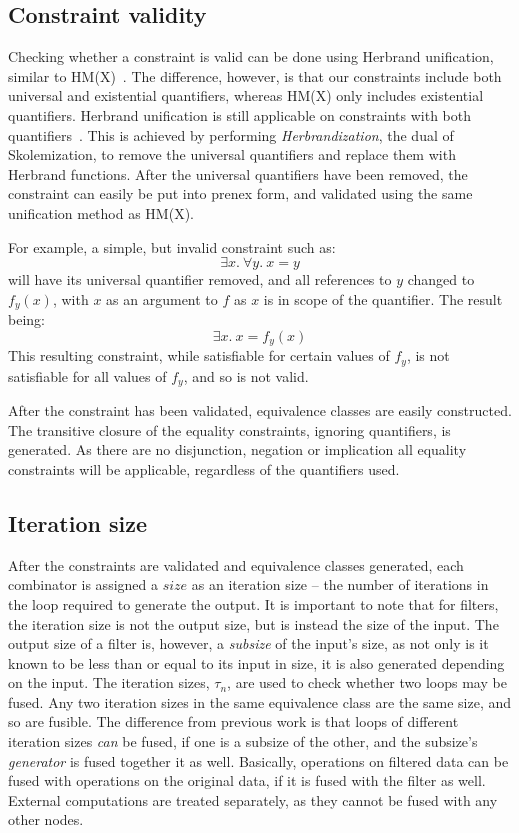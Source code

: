 \subsection{Constraint validity}
Checking whether a constraint is valid can be done using Herbrand unification, similar to HM(X)~\cite{odersky1999type}.
The difference, however, is that our constraints include both universal and existential quantifiers, whereas HM(X) only includes existential quantifiers.
Herbrand unification is still applicable on constraints with both quantifiers~\cite{buss1995herbrand}.
This is achieved by performing \emph{Herbrandization}, the dual of Skolemization, to remove the universal quantifiers and replace them with Herbrand functions.
After the universal quantifiers have been removed, the constraint can easily be put into prenex form, and validated using the same unification method as HM(X).

For example, a simple, but invalid constraint such as:
\[ \exists x.\ \forall y.\ x = y \]
will have its universal quantifier removed, and all references to $y$ changed to $f_y(x)$, with $x$ as an argument to $f$ as $x$ is in scope of the quantifier.
The result being:
\[ \exists x.\ x = f_y(x) \]
This resulting constraint, while satisfiable for certain values of $f_y$, is not satisfiable for all values of $f_y$, and so is not valid.

After the constraint has been validated, equivalence classes are easily constructed.
The transitive closure of the equality constraints, ignoring quantifiers, is generated.
As there are no disjunction, negation or implication all equality constraints will be applicable, regardless of the quantifiers used.


\subsection{Iteration size}
After the constraints are validated and equivalence classes generated, each combinator is assigned a $size$ as an iteration size -- the number of iterations in the loop required to generate the output.
It is important to note that for filters, the iteration size is not the output size, but is instead the size of the input.
The output size of a filter is, however, a \emph{subsize} of the input's size, as not only is it known to be less than or equal to its input in size, it is also generated depending on the input.
The iteration sizes, $\tau_n$, are used to check whether two loops may be fused.
Any two iteration sizes in the same equivalence class are the same size, and so are fusible.
The difference from previous work is that loops of different iteration sizes \emph{can} be fused, if one is a subsize of the other, and the subsize's \emph{generator} is fused together it as well.
Basically, operations on filtered data can be fused with operations on the original data, if it is fused with the filter as well.
External computations are treated separately, as they cannot be fused with any other nodes.

